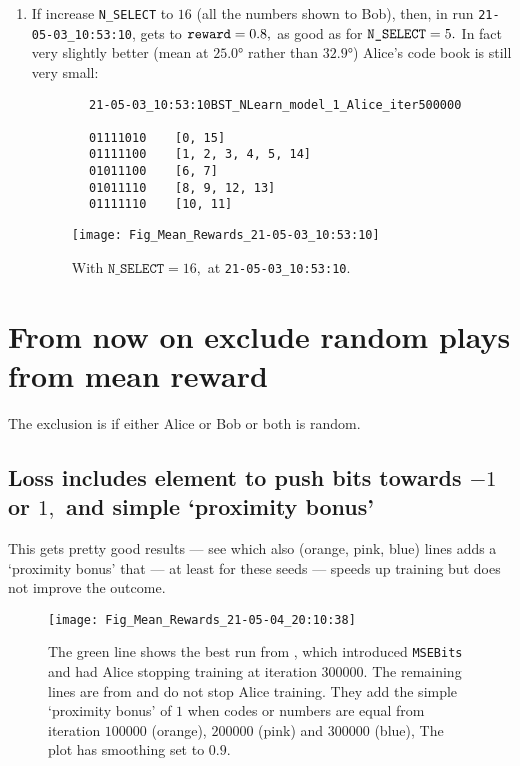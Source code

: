 \documentclass[12pt]{article}
\begin{document}
\begin{enumerate}
	\item If increase \verb|N_SELECT| to $16$ (all the numbers shown to Bob), then, in run \verb|21-05-03_10:53:10|, gets to $\verb|reward|=0.8,$ as good as for $\verb|N_SELECT|=5.$ In fact very slightly better (mean at  $\ang{25.0}$ rather than $\ang{32.9}$) Alice's code book is still very small:
	\begin{lstlisting}
		21-05-03_10:53:10BST_NLearn_model_1_Alice_iter500000
		
		01111010	[0, 15]
		01111100	[1, 2, 3, 4, 5, 14]
		01011100	[6, 7]
		01011110	[8, 9, 12, 13]
		01111110	[10, 11]
	\end{lstlisting}
\begin{figure}
	\centering
	\texttt{[image: Fig\_Mean\_Rewards\_21-05-03\_10:53:10]}
	\caption{With $\texttt{N\_SELECT}=16,$ at \texttt{21-05-03\_10:53:10}.}
	\label{fig:figmeanrewards21-05-03105310}
\end{figure}
	
\end{enumerate}

\section{From now on exclude random plays from mean reward}

The exclusion is if either Alice or Bob or both is random.

\subsection{Loss includes element to push bits towards $-1$ or $1,$ and simple `proximity bonus'}\label{sec:loss-includes-element-to-push-bits-towards--1-or-1-and-simple-proximity-bonus}

This gets pretty good results --- see  which also (orange, pink, blue) lines adds a `proximity bonus' that --- at least for these seeds --- speeds up training but does not improve the outcome.
\begin{figure}
	\centering
	\texttt{[image: Fig\_Mean\_Rewards\_21-05-04\_20:10:38]}
	\caption{The green line shows the best run from , which introduced \texttt{MSEBits} and had Alice stopping training at iteration $\num{300000}.$  The remaining lines are from  and do not stop Alice training.  They add the simple `proximity bonus' of $1$ when codes or numbers are equal from iteration $\num{100000}$ (orange), $\num{200000}$ (pink) and $\num{300000}$ (blue),  The plot has smoothing set to $0.9.$}
	\label{fig:figmeanrewards21-05-04201038}
\end{figure}
\end{document}
